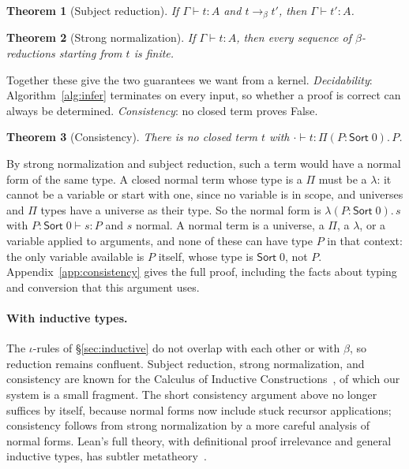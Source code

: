 \documentclass[acmsmall,screen,nonacm]{acmart}
\newtheorem{theorem}{Theorem}
\newcommand{\Sort}[1]{\mathsf{Sort}\;#1}
\newcommand{\tPi}[3]{\Pi(#1{:}#2).\,#3}
\newcommand{\tLam}[3]{\lambda(#1{:}#2).\,#3}
\newcommand{\betared}{\to_{\beta}}
\begin{document}
\begin{theorem}[Subject reduction]
If $\Gamma \vdash t : A$ and $t \betared t'$, then $\Gamma \vdash t' : A$.
\end{theorem}

\begin{theorem}[Strong normalization]
If $\Gamma \vdash t : A$, then every sequence of $\beta$-reductions starting from $t$ is finite.
\end{theorem}

Together these give the two guarantees we want from a kernel.
\emph{Decidability}: Algorithm~\ref{alg:infer} terminates on every input, so whether a proof is correct can always be determined.
\emph{Consistency}: no closed term proves False.

\begin{theorem}[Consistency]
\label{thm:consistency}
There is no closed term $t$ with $\cdot \vdash t : \tPi{P}{\Sort{0}}{P}$.
\end{theorem}

\noindent By strong normalization and subject reduction, such a term would have a normal form of the same type.
A closed normal term whose type is a $\Pi$ must be a $\lambda$:
it cannot be a variable or start with one, since no variable is in scope, and universes and $\Pi$ types have a universe as their type.
So the normal form is $\tLam{P}{\Sort{0}}{s}$ with $P : \Sort{0} \vdash s : P$ and $s$ normal.
A normal term is a universe, a $\Pi$, a $\lambda$, or a variable applied to arguments, and none of these can have type $P$ in that context:
the only variable available is $P$ itself, whose type is $\Sort{0}$, not $P$.
Appendix~\ref{app:consistency} gives the full proof, including the facts about typing and conversion that this argument uses.

\paragraph{With inductive types.}
The $\iota$-rules of \S\ref{sec:inductive} do not overlap with each other or with $\beta$, so reduction remains confluent.
Subject reduction, strong normalization, and consistency are known for the Calculus of Inductive Constructions~\cite{werner1994theorie}, of which our system is a small fragment.
The short consistency argument above no longer suffices by itself, because normal forms now include stuck recursor applications;
consistency follows from strong normalization by a more careful analysis of normal forms.
Lean's full theory, with definitional proof irrelevance and general inductive types, has subtler metatheory~\cite{carneiro2019type}.
\end{document}
